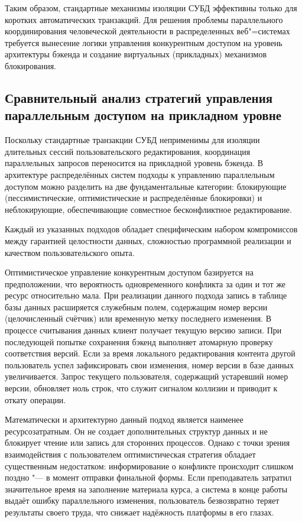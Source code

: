 \documentclass[coursework]{SCWorks}
\begin{document}
Таким образом, стандартные механизмы изоляции СУБД эффективны только для коротких автоматических транзакций. Для решения проблемы параллельного координирования человеческой деятельности в распределенных веб"=системах требуется вынесение логики управления конкурентным доступом на уровень архитектуры бэкенда и создание виртуальных (прикладных) механизмов блокирования.

\subsection{Сравнительный анализ стратегий управления параллельным доступом на прикладном уровне}

Поскольку стандартные транзакции СУБД неприменимы для изоляции длительных сессий пользовательского редактирования, координация параллельных запросов переносится на прикладной уровень бэкенда. В архитектуре распределённых систем подходы к управлению параллельным доступом можно разделить на две фундаментальные категории: блокирующие (пессимистические, оптимистические и распределённые блокировки) и неблокирующие, обеспечивающие совместное бесконфликтное редактирование.

Каждый из указанных подходов обладает специфическим набором компромиссов между гарантией целостности данных, сложностью программной реализации и качеством пользовательского опыта.

Оптимистическое управление конкурентным доступом базируется на предположении, что вероятность одновременного конфликта за один и тот же ресурс относительно мала. При реализации данного подхода запись в таблице базы данных расширяется служебным полем, содержащим номер версии (целочисленный счётчик) или временную метку последнего изменения. В процессе считывания данных клиент получает текущую версию записи. При последующей попытке сохранения бэкенд выполняет атомарную проверку соответствия версий. Если за время локального редактирования контента другой пользователь успел зафиксировать свои изменения, номер версии в базе данных увеличивается. Запрос текущего пользователя, содержащий устаревший номер версии, обновляет ноль строк, что служит сигналом коллизии и приводит к откату операции.

Математически и архитектурно данный подход является наименее ресурсозатратным. Он не создает дополнительных структур данных и не блокирует чтение или запись для сторонних процессов. Однако с точки зрения взаимодействия с пользователем оптимистическая стратегия обладает существенным недостатком: информирование о конфликте происходит слишком поздно "--- в момент отправки финальной формы. Если преподаватель затратил значительное время на заполнение материала курса, а система в конце работы выдаёт ошибку параллельного изменения, пользователь безвозвратно теряет результаты своего труда, что снижает надёжность платформы в его глазах.
\end{document}
